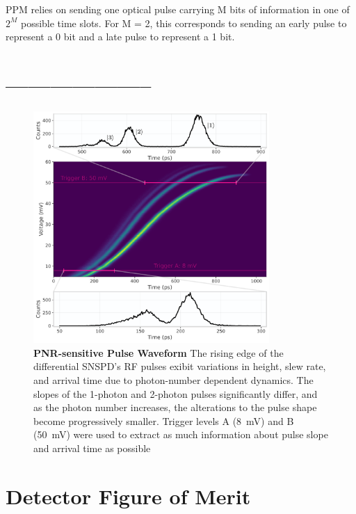 \documentclass{optica-article}
\begin{document}
PPM relies on sending one optical pulse carrying M bits of information in one of $2^M$ possible time slots. For M = 2, this corresponds to sending an early pulse to represent a 0 bit and a late pulse to represent a 1 bit.

\hypertarget{section-1}{%
\section{--------------------}\label{section-1}}

\hypertarget{fig:waveform}{%
\begin{figure}
\centering
\includegraphics[width=0.8\textwidth]{./figs_03/waveform_light.pdf}
\caption[{PNR-sensitive Pulse Waveform}]{\textbf{PNR-sensitive Pulse Waveform} The rising edge of the differential SNSPD's RF pulses exibit variations in height, slew rate, and arrival time due to photon-number dependent dynamics. The slopes of the 1-photon and 2-photon pulses significantly differ, and as the photon number increases, the alterations to the pulse shape become progressively smaller. Trigger levels A (8~mV) and B (50~mV) were used to extract as much information about pulse slope and arrival time as possible}
\label{fig:waveform}
\end{figure}
}

\hypertarget{detector-figure-of-merit}{%
\section{Detector Figure of Merit}\label{detector-figure-of-merit}}
\end{document}
